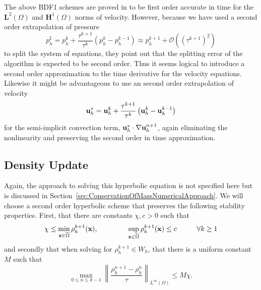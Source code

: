 \documentclass[letterpaper]{erdc}
\begin{document}
The above BDF1 schemes are proved in \cite{guermond2011error} to be first order accurate in time for the $\mathbf{L}^2(\Omega)$ and $\mathbf{H}^1(\Omega)$ norms of velocity.  However, because we have used a second order extrapolation of pressure
\begin{equation}
  p^{\sharp}_h = p_h^{k} + \frac{\tau^{k+1}}{\tau^{k}}\left( p_h^{k} - p_h^{k-1} \right) \approx p_h^{k+1} + \mathcal{O}\left(\left(\tau^{k+1}\right)^2 \right)
\end{equation}
to split the system of equations, they point out that the splitting error of the algorithm is expected to be second order.  Thus it seems logical to introduce a second order approximation to the time derivative for the velocity equations.  Likewise it might be advantageous to use an second order extrapolation of velocity 
\begin{equation}
  \textbf{u}^{*}_h = \textbf{u}_h^{k} + \frac{\tau^{k+1}}{\tau^{k}}\left( \textbf{u}_h^{k} - \textbf{u}_h^{k-1} \right)
\end{equation}
for the semi-implicit convection term, $\textbf{u}_h^{*}\cdot\nabla\textbf{u}_h^{n+1}$, again eliminating the nonlinearity and preserving the second order in time approximation.


\subsection{Density Update}
Again, the approach to solving this hyperbolic equation is not specified here but is discussed in Section~\ref{sec:ConservationOfMassNumericalApproach}.  We will choose a second order hyperbolic scheme that preserves the following stability properties.  First, that there are constants $\chi, c > 0$ such that 
\begin{equation}
  \chi \leq \displaystyle\min_{\textbf{x}\in\overline{\Omega}} \rho_h^{k+1}(\textbf{x}),  \hspace{1.5cm} \displaystyle\sup_{\textbf{x}\in\overline{\Omega}}\rho_h^{k+1}(\textbf{x}) \leq c \hspace{1cm} \forall k\geq 1
\end{equation}
and secondly that when solving for $\rho_h^{k+1}\in W_h$, that there is a uniform constant $M$ such that
\begin{equation}
  \displaystyle\max_{0\leq n\leq k-1} \left \| \frac{\rho_h^{n+1} - \rho_h^{n}}{\tau}\right\|_{L^{\infty}(\Omega)} \leq M\chi.
\end{equation}
\end{document}
